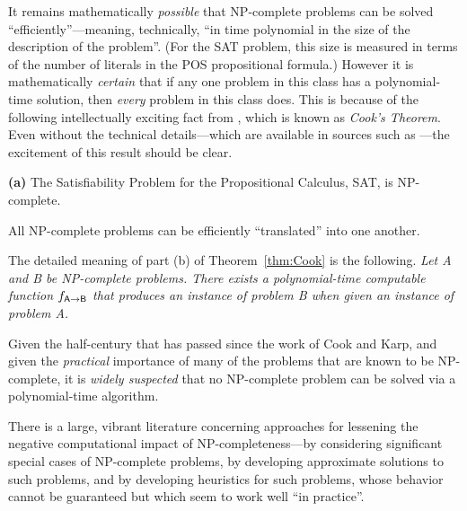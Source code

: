 {
It remains mathematically {\em possible} that {\sf NP}-complete problems can be solved ``efficiently''---meaning, technically, ``in time polynomial in the size of the description of the problem''.  (For the {\sf SAT} problem, this size is measured in terms of the number of literals in the POS propositional formula.)  However it is mathematically {\em certain} that if any one problem in this class has a polynomial-time solution, then {\em every} problem in this class does.  This is because of the following intellectually exciting fact from  \cite{Cook71}, which is known as {\it Cook's Theorem}.  Even without the technical details---which are available in sources such as
\cite{GareyJ79,Rosenberg09}---the excitement of this result should be clear.

\begin{theorem}
\label{thm:Cook}
{\bf (a)}
The Satisfiability Problem for the Propositional Calculus, {\sf SAT}, is {\sf NP}-complete.

All {\sf NP}-complete problems can be efficiently ``translated'' into one another.
\end{theorem}

The detailed meaning of part (b) of Theorem~\ref{thm:Cook} is the following.  {\em Let {\sf A} and {\sf B} be {\sf NP}-complete problems.  There exists a polynomial-time computable function $f_{{\sf A} \rightarrow {\sf B}}$ that produces an instance of problem {\sf B} when given an instance of problem {\sf A}.}

\medskip

Given the half-century that has passed since the work of Cook and Karp, and given the {\em practical} importance of many of the problems that are known to be {\sf NP}-complete, it is {\em widely suspected} that no {\sf NP}-complete problem can be solved via a polynomial-time
algorithm.

\medskip

There is a large, vibrant literature concerning approaches for lessening the negative computational impact of {\sf NP}-completeness---by considering significant special cases of {\sf
  NP}-complete problems, by developing approximate solutions to such problems, and by developing heuristics for such problems, whose behavior cannot be guaranteed but which seem to work well ``in practice''.

\medskip


}
